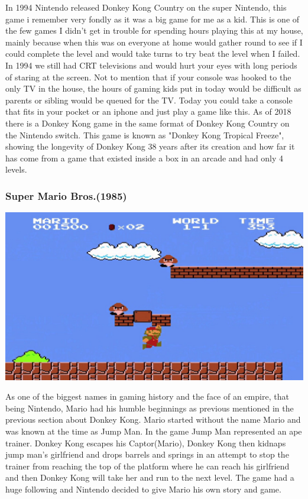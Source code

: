 \documentclass{article}
\begin{document}
In 1994 Nintendo released Donkey Kong Country on the super Nintendo, this game i remember very fondly as it was a big game for me as a kid. This is one of the few games I didn't get in trouble for spending hours playing this at my house, mainly because when this was on everyone at home would gather round to see if I could complete the level and would take turns to try beat the level when I failed. In 1994 we still had CRT televisions and would hurt your eyes with long periods of staring at the screen. Not to mention that if your console was hooked to the only TV in the house, the hours of gaming kids put in today would be difficult as parents or sibling would be queued for the TV. Today you could take a console that fits in your pocket or an iphone and just play a game like this. As of 2018 there is a Donkey Kong game in the same format of Donkey Kong Country on the Nintendo switch. This game is known as "Donkey Kong Tropical Freeze", showing the longevity of Donkey Kong 38 years after its creation and how far it has come from a game that existed inside a box in an arcade and had only 4 levels.

\clearpage

\subsubsection{Super Mario Bros.(1985)}
\begin{minipage}{0.43\textwidth}
\includegraphics[width=\linewidth]{mario}
\end{minipage} \hfill
\begin{minipage}{0.55\textwidth}\raggedright
As one of the biggest names in gaming history and the face of an empire, that being Nintendo, Mario had his humble beginnings as previous mentioned in the previous section about Donkey Kong. Mario started without the name Mario and was known at the time as Jump Man. In the game Jump Man represented an ape trainer. Donkey Kong escapes his Captor(Mario), Donkey Kong then kidnaps jump man's girlfriend and drops barrels and springs in an attempt to stop the trainer from reaching the top of the platform where he can reach his girlfriend and then Donkey Kong will take her and run to the next level. The game had a huge following and Nintendo decided to give Mario his own story and game.
\end{minipage} \newline \newline
\end{document}
